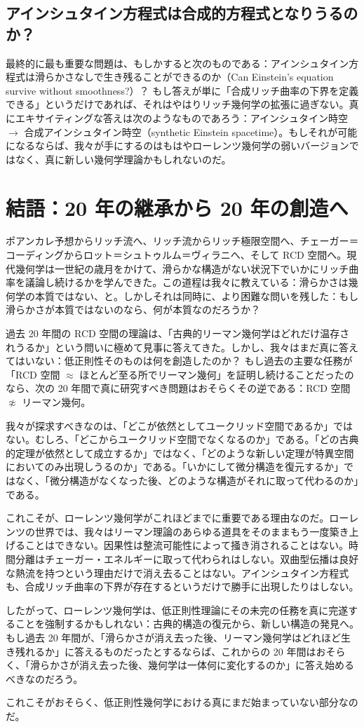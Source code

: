 \documentclass[lualatex]{ltjsarticle}
\begin{document}
\subsection{アインシュタイン方程式は合成的方程式となりうるのか？}

最終的に最も重要な問題は、もしかすると次のものである：アインシュタイン方程式は滑らかさなしで生き残ることができるのか（Can Einstein's equation survive without smoothness?）？ もし答えが単に「合成リッチ曲率の下界を定義できる」というだけであれば、それはやはりリッチ幾何学の拡張に過ぎない。真にエキサイティングな答えは次のようなものであろう：アインシュタイン時空 $\longrightarrow$ 合成アインシュタイン時空（synthetic Einstein spacetime）。もしそれが可能になるならば、我々が手にするのはもはやローレンツ幾何学の弱いバージョンではなく、真に新しい幾何学理論かもしれないのだ。

\section{結語：20 年の継承から 20 年の創造へ}

ポアンカレ予想からリッチ流へ、リッチ流からリッチ極限空間へ、チェーガー＝コーディングからロット＝シュトゥルム＝ヴィラニへ、そして RCD 空間へ。現代幾何学は一世紀の歳月をかけて、滑らかな構造がない状況下でいかにリッチ曲率を議論し続けるかを学んできた。この道程は我々に教えている：滑らかさは幾何学の本質ではない、と。しかしそれは同時に、より困難な問いを残した：もし滑らかさが本質ではないのなら、何が本質なのだろうか？

過去 20 年間の RCD 空間の理論は、「古典的リーマン幾何学はどれだけ温存されうるか」という問いに極めて見事に答えてきた。しかし、我々はまだ真に答えてはいない：低正則性そのものは何を創造したのか？ もし過去の主要な任務が「RCD 空間 $\approx$ ほとんど至る所でリーマン幾何」を証明し続けることだったのなら、次の 20 年間で真に研究すべき問題はおそらくその逆である：RCD 空間 $\not\approx$ リーマン幾何。

我々が探求すべきなのは、「どこが依然としてユークリッド空間であるか」ではない。むしろ、「どこからユークリッド空間でなくなるのか」である。「どの古典的定理が依然として成立するか」ではなく、「どのような新しい定理が特異空間においてのみ出現しうるのか」である。「いかにして微分構造を復元するか」ではなく、「微分構造がなくなった後、どのような構造がそれに取って代わるのか」である。

これこそが、ローレンツ幾何学がこれほどまでに重要である理由なのだ。ローレンツの世界では、我々はリーマン理論のあらゆる道具をそのままもう一度築き上げることはできない。因果性は整流可能性によって掻き消されることはない。時間分離はチェーガー・エネルギーに取って代わられはしない。双曲型伝播は良好な熱流を持つという理由だけで消え去ることはない。アインシュタイン方程式も、合成リッチ曲率の下界が存在するというだけで勝手に出現したりはしない。

したがって、ローレンツ幾何学は、低正則性理論にその未完の任務を真に完遂することを強制するかもしれない：古典的構造の復元から、新しい構造の発見へ。もし過去 20 年間が、「滑らかさが消え去った後、リーマン幾何学はどれほど生き残れるか」に答えるものだったとするならば、これからの 20 年間はおそらく、「滑らかさが消え去った後、幾何学は一体何に変化するのか」に答え始めるべきなのだろう。

これこそがおそらく、低正則性幾何学における真にまだ始まっていない部分なのだ。
\end{document}
